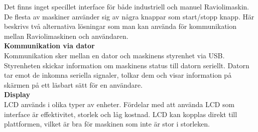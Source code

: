 Det finns inget specillet interface för både industriell och manuel Raviolimaskin. De flesta av maskiner använder sig av några knappar som start/stopp knapp. Här beskrivs två alternativa lösningar som man kan använda för kommunikation mellan Raviolimaskinen och användaren.\\

\textbf{Kommunikation via dator}\\
Kommunikation sker mellan en dator och maskinens styrenhet via USB. Styrenheten skickar information om maskinens status till datorn seriellt\cite{Arduinocookbook}. Datorn tar emot de inkomna seriella signaler, tolkar dem och visar information på skärmen på ett läsbart sätt för en användare.\\


\textbf{Display}\\
LCD används i olika typer av enheter. Fördelar med att använda LCD som interface är effektivitet, storlek och låg kostnad.  LCD kan kopplas direkt till plattformen, vilket är bra för maskinen som inte är stor i storleken.

